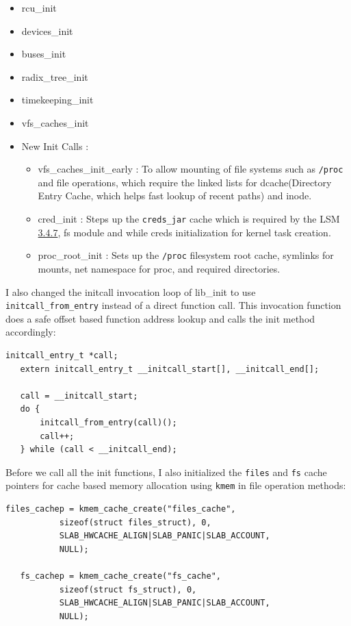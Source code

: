 \documentclass{sig-alternate}
\begin{document}
\begin{itemize}
\item rcu\_init
\item devices\_init
\item buses\_init
\item radix\_tree\_init 
\item timekeeping\_init 
\item vfs\_caches\_init \
\item New Init Calls :
\begin{itemize}
  \item vfs\_caches\_init\_early : To allow mounting of file systems such as \texttt{/proc} and file operations, which require the linked lists for 
  dcache(Directory Entry Cache, which helps fast lookup of recent paths) and inode.
  \item cred\_init : Steps up the \texttt{creds\_jar} cache which is required by the LSM \hyperref[Section_LSM]{3.4.7}, fs module and 
  while creds initialization for kernel task creation.
  \item proc\_root\_init : Sets up the \texttt{/proc} filesystem root cache, symlinks for mounts, net namespace for proc, and required directories.
\end{itemize}
\end{itemize}

I also changed the initcall invocation loop of lib\_init to use \texttt{initcall\_from\_entry} instead of a direct function call. 
This invocation function does a safe offset based function address lookup and calls the init method accordingly: 

\begin{lstlisting}[style=CStyle] 
   initcall_entry_t *call;
   extern initcall_entry_t __initcall_start[], __initcall_end[];
 
   call = __initcall_start;
   do {               
       initcall_from_entry(call)();               
       call++;
   } while (call < __initcall_end);

\end{lstlisting}

Before we call all the init functions, I also initialized the \texttt{files} and \texttt{fs} cache pointers for cache based memory 
allocation using \texttt{kmem} in file operation methods:

\begin{lstlisting}[style=CStyle]
   files_cachep = kmem_cache_create("files_cache",
           sizeof(struct files_struct), 0,
           SLAB_HWCACHE_ALIGN|SLAB_PANIC|SLAB_ACCOUNT,
           NULL);
 
   fs_cachep = kmem_cache_create("fs_cache",
           sizeof(struct fs_struct), 0,
           SLAB_HWCACHE_ALIGN|SLAB_PANIC|SLAB_ACCOUNT,
           NULL);
\end{lstlisting}
\end{document}
